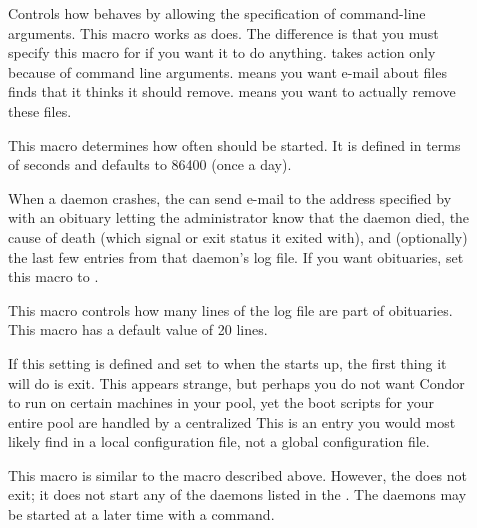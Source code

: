 \begin{description}
\item[] \label{param:PreenArgs}
  Controls how  behaves by allowing the specification
  of command-line arguments.
  This macro works as  does.
  The difference is that you must specify this macro for
   if you want it to do anything.
   takes action only
  because of command line arguments.
   means you want e-mail about files  finds that it
  thinks it should remove.
   means you want  to actually remove these files.

\item[] \label{param:PreenInterval} This macro
  determines how often  should be started.  It is
  defined in terms of seconds and defaults to 86400 (once a day).

\item[] \label{param:PublishObituaries}
  When a daemon crashes, the  can send e-mail to the
  address specified by  with an obituary letting
  the administrator know that the daemon died, the cause of
  death (which signal or exit status it exited with), and
  (optionally) the last few entries from that daemon's log file.  If
  you want obituaries, set this macro to .

\item[] \label{param:ObituaryLogLength}
  This macro controls how many lines
  of the log file are part of obituaries.  This macro has a default
  value of 20 lines.

\item[] \label{param:StartMaster} If this setting
  is defined and set to  when the  starts up, the first
  thing it will do is exit.  This appears strange, but perhaps you
  do not want Condor to run on certain machines in your pool, yet
  the boot scripts for your entire pool are handled by a centralized
  This is
  an entry you would most likely find in a local configuration file,
  not a global configuration file.

\item[] \label{param:StartDaemons} This macro
  is similar to the  macro described above.
  However, the  does not exit; it does not start any
  of the daemons listed in the .
  The daemons may be started at a later time with a 
  command.


\end{description}
